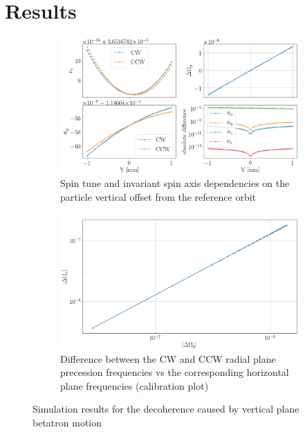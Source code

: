 \documentclass[a4paper]{jacow}
\begin{document}
\section{Results}

\begin{figure}[h]
  \centering
  \begin{subfigure}{\linewidth}\centering
    \includegraphics[width=\linewidth]{../img/IPAC19/GFF_stune_range_Y}
    \caption{Spin tune and invariant spin axis dependencies on the particle vertical offset
      from the reference orbit\label{fig:Y:calib_plot:stune}}
  \end{subfigure}
  \begin{subfigure}{\linewidth}\centering
    \includegraphics[width=\linewidth]{../img/IPAC19/GFF_omegas_range_Y}
    \caption{Difference between the CW and CCW radial plane precession frequencies
      vs the corresponding horizontal plane frequencies (calibration plot)\label{fig:Y:calib_plot:omegas}}
  \end{subfigure}
  \caption{Simulation results for the decoherence caused by
    vertical plane betatron motion\label{fig:Y:calib_plot}}
\end{figure}
\end{document}
